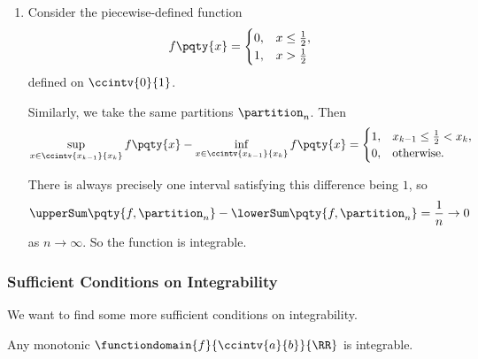 \begin{examples}
\begin{enumerate}
        \item Consider the piecewise-defined function
        \[
            f\pqty{x} = \begin{cases}
                0, & x \leq \frac{1}{2}, \\
                1, & x > \frac{1}{2}
            \end{cases}
        \]
        defined on \(\ccintv{0}{1}\).

        Similarly, we take the same partitions \(\partition_n\). Then
        \[
            \sup_{x \in \ccintv{x_{k - 1}}{x_k}} f\pqty{x} - \inf_{x \in \ccintv{x_{k - 1}}{x_k}} f\pqty{x} = \begin{cases}
                1, & x_{k - 1} \leq \frac{1}{2} < x_k,\\
                0, & \text{otherwise}.
            \end{cases}
        \]

        There is always precisely one interval satisfying this difference being \(1\), so
        \[
            \upperSum\pqty{f, \partition_n} - \lowerSum\pqty{f, \partition_n} = \frac{1}{n} \to 0
        \]
        as \(n \to \infty\). So the function is integrable.
    \end{enumerate}
\end{examples}

\subsubsection{Sufficient Conditions on Integrability}

We want to find some more sufficient conditions on integrability.

\begin{proposition}
    \label{prop:monotonic-integrable}%
    Any monotonic \(\functiondomain{f}{\ccintv{a}{b}}{\RR}\) is integrable.
\end{proposition}


